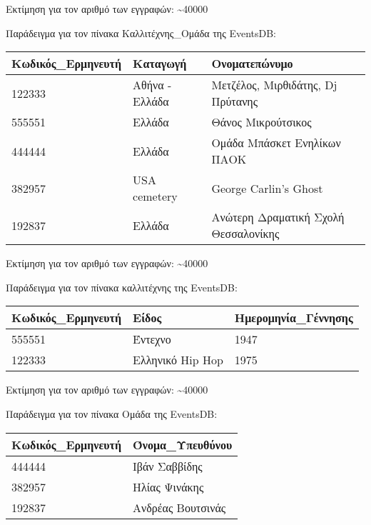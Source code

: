 Εκτίμηση για τον αριθμό των εγγραφών: \textasciitilde 40000

Παράδειγμα για τον πίνακα Καλλιτέχνης\_Ομάδα της EventsDB:

\begin{table}[H]
  \centering
  \footnotesize
  \begin{tabular}{|l|l|l|}
  \hline
  Κωδικός\_Ερμηνευτή & Καταγωγή & Ονοματεπώνυμο \\ \hline
  122333 & Αθήνα - Ελλάδα & Μετζέλος, Μιρθιδάτης, Dj Πρύτανης \\ \hline
  555551 & Ελλάδα & Θάνος Μικρούτσικος \\ \hline
  444444 & Ελλάδα & Ομάδα Μπάσκετ Ενηλίκων ΠΑΟΚ \\ \hline
  382957 & USA cemetery & George Carlin's Ghost  \\ \hline
  192837 & Ελλάδα & Ανώτερη Δραματική Σχολή Θεσσαλονίκης \\ \hline
\end{tabular}
\end{table}
  
Εκτίμηση για τον αριθμό των εγγραφών: \textasciitilde 40000

Παράδειγμα για τον πίνακα καλλιτέχνης της EventsDB:

\begin{table}[H]
  \centering
  \footnotesize
  \begin{tabular}{|l|l|l|}
  \hline
  Κωδικός\_Ερμηνευτή & Είδος & Ημερομηνία\_Γέννησης \\ \hline
  555551 & Έντεχνο & 1947 \\ \hline
  122333 & Ελληνικό Hip Hop & 1975 \\ \hline
\end{tabular}
\end{table}
  
Εκτίμηση για τον αριθμό των εγγραφών: \textasciitilde 40000

Παράδειγμα για τον πίνακα Ομάδα της EventsDB:

\begin{table}[H]
  \centering
  \footnotesize
  \begin{tabular}{|l|l|}
  \hline
  Κωδικός\_Ερμηνευτή & Όνομα\_Υπευθύνου \\ \hline
  444444 & Ιβάν Σαββίδης \\ \hline
  382957 & Ηλίας Ψινάκης \\ \hline
  192837 & Ανδρέας Βουτσινάς \\ \hline
\end{tabular}
\end{table}
  
